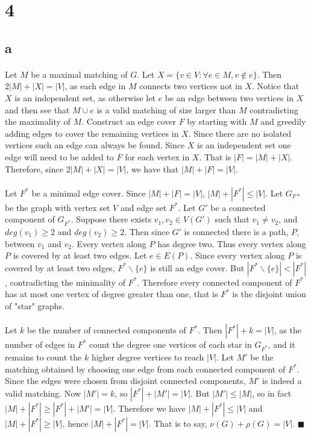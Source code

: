 \documentclass[letterpaper,12pt,oneside,onecolumn]{report}
\begin{document}
\section*{4}
\subsection*{a}
\paragraph{}
Let $M$ be a maximal matching of $G$. Let $X = \{v \in V : \forall e \in M, v \not\in e\}$. Then $2|M| + |X| = |V|$, as each edge in $M$ connects two vertices not in $X$. Notice that $X$ is an independent set, as otherwise let $e$ be an edge between two vertices in $X$ and then see that $M \cup e $ is a valid matching of size larger than $M$ contradicting the maximality of $M$. Construct an edge cover $F$ by starting with $M$ and greedily adding edges to cover the remaining vertices in $X$. Since there are no isolated vertices such an edge can always be found. Since $X$ is an independent set one edge will need to be added to $F$ for each vertex in $X$. That is $|F| = |M| + |X|$. Therefore, since $2|M| + |X| = |V|$, we have that $|M| + |F| = |V|$.
\paragraph{}
Let $F^*$ be a minimal edge cover. Since $|M| + |F| = |V|$, $|M| + |F^*| \leq |V|$. Let $G_{F*}$ be the graph with vertex set $V$ and edge set $F^*$. Let $G'$ be a connected component of $G_{F^*}$. Suppose there exists $v_1, v_2 \in V(G')$ such that $v_1 \neq v_2$, and $deg(v_1) \geq 2$ and $deg(v_2)\geq 2$. Then since $G'$ is connected there is a path, $P$, between $v_1$ and $v_2$. Every vertex along $P$ has degree two. Thus every vertex along $P$ is covered by at least two edges. Let $e \in E(P)$. Since every vertex along $P$ is covered by at least two edges, $F^* \backslash \{e\}$ is still an edge cover. But $|F^* \backslash \{e\}| < |F^*|$, contradicting the minimality of $F^*$. Therefore every connected component of $F^*$ has at most one vertex of degree greater than one, that is $F^*$ is the disjoint union of "star" graphs.
\paragraph{}
Let $k$ be the number of connected components of $F^*$. Then $|F^*| + k = |V|$, as the number of edges in $F^*$ count the degree one vertices of each star in $G_{F^*}$, and it remains to count the $k$ higher degree vertices to reach $|V|$. Let $M'$ be the matching obtained by choosing one edge from each connected component of $F^*$. Since the edges were chosen from disjoint connected components, $M'$ is indeed a valid matching. Now $|M'| = k$, so $|F^*| + |M'| = |V|$. But $|M'| \leq |M|$, so in fact $|M| + |F^*| \geq |F^*| + |M'| = |V|$. Therefore we have $|M| + |F^*| \leq |V|$ and $|M| + |F^*| \geq |V|$, hence $|M| + |F^*| = |V|$. That is to say, $\nu(G) + \rho(G) = |V|$. $\blacksquare$
\end{document}
